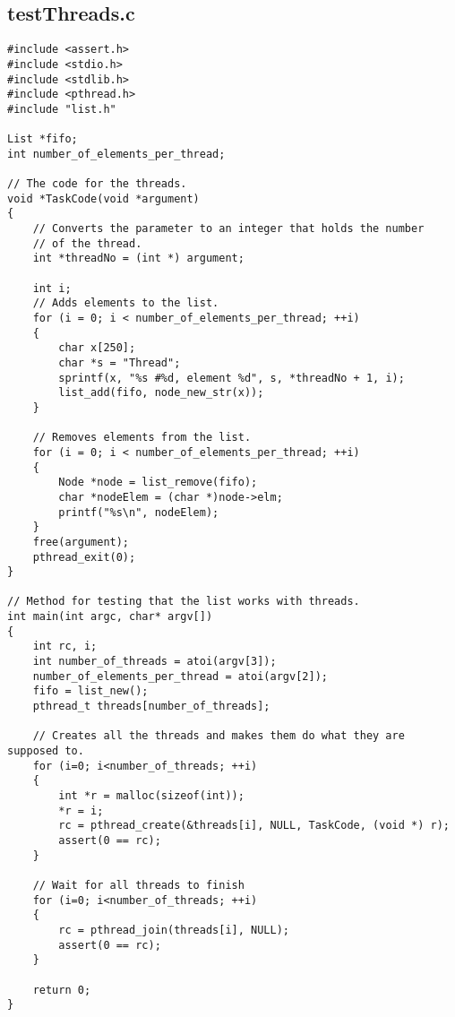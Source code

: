 \subsection{testThreads.c}
\begin{lstlisting}
#include <assert.h>
#include <stdio.h>
#include <stdlib.h>
#include <pthread.h>
#include "list.h"

List *fifo;
int number_of_elements_per_thread;

// The code for the threads.
void *TaskCode(void *argument)
{
    // Converts the parameter to an integer that holds the number
    // of the thread.
    int *threadNo = (int *) argument;

    int i;
    // Adds elements to the list.
    for (i = 0; i < number_of_elements_per_thread; ++i)
    {
        char x[250];
        char *s = "Thread";
        sprintf(x, "%s #%d, element %d", s, *threadNo + 1, i);
        list_add(fifo, node_new_str(x));
    }

    // Removes elements from the list.
    for (i = 0; i < number_of_elements_per_thread; ++i)
    {
        Node *node = list_remove(fifo);
        char *nodeElem = (char *)node->elm;
        printf("%s\n", nodeElem);
    }
	free(argument);
    pthread_exit(0);
}

// Method for testing that the list works with threads.
int main(int argc, char* argv[])
{
    int rc, i;
    int number_of_threads = atoi(argv[3]);
    number_of_elements_per_thread = atoi(argv[2]);
    fifo = list_new();
    pthread_t threads[number_of_threads];

    // Creates all the threads and makes them do what they are supposed to.
    for (i=0; i<number_of_threads; ++i) 
    {
		int *r = malloc(sizeof(int));
		*r = i;
        rc = pthread_create(&threads[i], NULL, TaskCode, (void *) r);
        assert(0 == rc);
    }
  
    // Wait for all threads to finish
    for (i=0; i<number_of_threads; ++i) 
    {
        rc = pthread_join(threads[i], NULL);
        assert(0 == rc);
    }

    return 0;
}

\end{lstlisting}